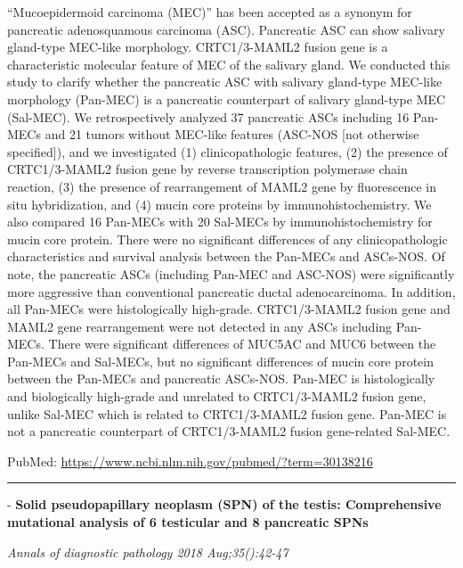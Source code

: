 \documentclass[]{article}
\begin{document}
``Mucoepidermoid carcinoma (MEC)'' has been accepted as a synonym for
pancreatic adenosquamous carcinoma (ASC). Pancreatic ASC can show
salivary gland-type MEC-like morphology. CRTC1/3-MAML2 fusion gene is a
characteristic molecular feature of MEC of the salivary gland. We
conducted this study to clarify whether the pancreatic ASC with salivary
gland-type MEC-like morphology (Pan-MEC) is a pancreatic counterpart of
salivary gland-type MEC (Sal-MEC). We retrospectively analyzed 37
pancreatic ASCs including 16 Pan-MECs and 21 tumors without MEC-like
features (ASC-NOS {[}not otherwise specified{]}), and we investigated
(1) clinicopathologic features, (2) the presence of CRTC1/3-MAML2 fusion
gene by reverse transcription polymerase chain reaction, (3) the
presence of rearrangement of MAML2 gene by fluorescence in situ
hybridization, and (4) mucin core proteins by immunohistochemistry. We
also compared 16 Pan-MECs with 20 Sal-MECs by immunohistochemistry for
mucin core protein. There were no significant differences of any
clinicopathologic characteristics and survival analysis between the
Pan-MECs and ASCs-NOS. Of note, the pancreatic ASCs (including Pan-MEC
and ASC-NOS) were significantly more aggressive than conventional
pancreatic ductal adenocarcinoma. In addition, all Pan-MECs were
histologically high-grade. CRTC1/3-MAML2 fusion gene and MAML2 gene
rearrangement were not detected in any ASCs including Pan-MECs. There
were significant differences of MUC5AC and MUC6 between the Pan-MECs and
Sal-MECs, but no significant differences of mucin core protein between
the Pan-MECs and pancreatic ASCs-NOS. Pan-MEC is histologically and
biologically high-grade and unrelated to CRTC1/3-MAML2 fusion gene,
unlike Sal-MEC which is related to CRTC1/3-MAML2 fusion gene. Pan-MEC is
not a pancreatic counterpart of CRTC1/3-MAML2 fusion gene-related
Sal-MEC.

PubMed: \url{https://www.ncbi.nlm.nih.gov/pubmed/?term=30138216}

{}

{}

\begin{center}\rule{0.5\linewidth}{\linethickness}\end{center}

 - \textbf{Solid pseudopapillary neoplasm (SPN) of the testis:
Comprehensive mutational analysis of 6 testicular and 8 pancreatic SPNs}

\emph{Annals of diagnostic pathology 2018 Aug;35():42-47}
\end{document}
